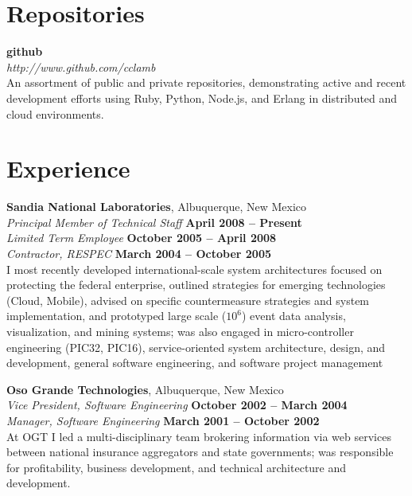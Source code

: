 \documentclass[margin,line]{resume}
\begin{document}
\begin{resume}
\section{\mysidestyle Repositories}
{\bf github} \vspace{2mm}  \\
{\sl http://www.github.com/cclamb} \vspace{1mm} \\
An assortment of public and private repositories, demonstrating active and recent development efforts using Ruby, Python, Node.js, and Erlang in distributed and cloud environments.

\section{\mysidestyle Experience}
{\bf Sandia National Laboratories}, Albuquerque, New Mexico \vspace{2mm} \\
{\sl Principal Member of Technical Staff} \hfill \textbf{April 2008 -- Present} \\
{\sl Limited Term Employee} \hfill \textbf{October 2005 -- April 2008} \\\vspace{1mm}%
{\sl Contractor, RESPEC} \hfill \textbf{March 2004 -- October 2005} \\
I most recently developed international-scale system architectures focused on protecting the federal enterprise, outlined strategies for emerging technologies (Cloud, Mobile), advised on specific countermeasure strategies and system implementation, and prototyped large scale ($10^6$) event data analysis, visualization, and mining systems; was also engaged in micro-controller engineering (PIC32, PIC16), service-oriented system architecture, design, and development, general software engineering, and software project management 

{\bf Oso Grande Technologies}, Albuquerque, New Mexico \vspace{2mm} \\
{\sl Vice President, Software Engineering} \hfill \textbf{October 2002 -- March 2004} \\\vspace{1mm}%
{\sl Manager, Software Engineering} \hfill \textbf{March 2001 -- October 2002} \\
At OGT I led a multi-disciplinary team brokering information via web services between national insurance aggregators and state governments; was responsible for profitability, business development, and technical architecture and development.


\end{resume}
\end{document}
